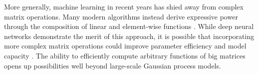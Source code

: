 More generally, machine learning in recent years has shied away from complex matrix operations.
Many modern algorithms instead derive expressive power through the composition of linear and element-wise functions \cite{goodfellow2016deep}.
While deep neural networks demonstrate the merit of this approach, it is possible that incorporating more complex matrix operations could improve parameter efficiency and model capacity \cite{jankowiak2020deep}.
The ability to efficiently compute arbitrary functions of big matrices opens up possibilities well beyond large-scale Gaussian process models.

